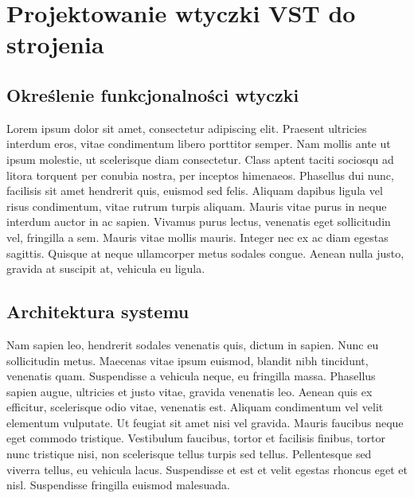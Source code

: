 
\setlength{\parindent}{1.25cm} %

\section{Projektowanie wtyczki VST do strojenia}

\subsection{Określenie funkcjonalności wtyczki}
\begin{spacing}{1.5} %
    Lorem ipsum dolor sit amet, consectetur adipiscing elit. Praesent ultricies interdum eros, vitae condimentum libero porttitor semper. Nam mollis ante ut ipsum molestie, ut scelerisque diam consectetur. Class aptent taciti sociosqu ad litora torquent per conubia nostra, per inceptos himenaeos. Phasellus dui nunc, facilisis sit amet hendrerit quis, euismod sed felis. Aliquam dapibus ligula vel risus condimentum, vitae rutrum turpis aliquam. Mauris vitae purus in neque interdum auctor in ac sapien. Vivamus purus lectus, venenatis eget sollicitudin vel, fringilla a sem. Mauris vitae mollis mauris. Integer nec ex ac diam egestas sagittis. Quisque at neque ullamcorper metus sodales congue. Aenean nulla justo, gravida at suscipit at, vehicula eu ligula. 
\end{spacing} %

\subsection{Architektura systemu}
\begin{spacing}{1.5} %
    Nam sapien leo, hendrerit sodales venenatis quis, dictum in sapien. Nunc eu sollicitudin metus. Maecenas vitae ipsum euismod, blandit nibh tincidunt, venenatis quam. Suspendisse a vehicula neque, eu fringilla massa. Phasellus sapien augue, ultricies et justo vitae, gravida venenatis leo. Aenean quis ex efficitur, scelerisque odio vitae, venenatis est. Aliquam condimentum vel velit elementum vulputate. Ut feugiat sit amet nisi vel gravida. Mauris faucibus neque eget commodo tristique. Vestibulum faucibus, tortor et facilisis finibus, tortor nunc tristique nisi, non scelerisque tellus turpis sed tellus. Pellentesque sed viverra tellus, eu vehicula lacus. Suspendisse et est et velit egestas rhoncus eget et nisl. Suspendisse fringilla euismod malesuada. 
\end{spacing} %

